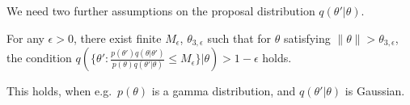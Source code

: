 

We need two further assumptions on the proposal distribution $q(\theta'|\theta)$.
\begin{assumption}
For any $\epsilon>0$,  there exist finite $M_\epsilon$, $\theta_{3,\epsilon}$
such that for $\theta$ satisfying $\| \theta \|  > \theta_{3,\epsilon}$,
the condition $q(\{\theta': \frac{p(\theta')q(\theta|\theta')}{p(\theta)q(\theta'|\theta)} \le M_\epsilon\}|\theta) 
> 1 - \epsilon$ holds.
  \label{asmp:prior}
\end{assumption}
This holds, when e.g.\ $p(\theta)$ is a gamma distribution,
and $q(\theta'|\theta)$ is Gaussian.


